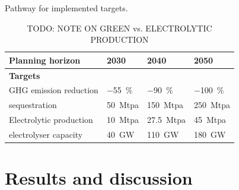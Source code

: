 \documentclass[preprint,12pt]{elsarticle}
\begin{document}
\begin{table}[htbp]
  \centering
  \caption{Pathway for implemented targets.}
  \label{tab:targets}
  \scriptsize
  \begin{tabularx}{\textwidth}{R{3.9cm}>{\centering\arraybackslash}X>{\centering\arraybackslash}X>{\centering\arraybackslash}X}
    \toprule
    \textbf{Planning horizon} & \textbf{2030} & \textbf{2040} & \textbf{2050} \\
    \midrule
    \textbf{Targets} & & & \\
    GHG emission reduction &  \SI{-55}{\percent} & \SI{-90}{\percent} & \SI{-100}{\percent} \\
     sequestration & \SI{50}{Mtpa} & \SI{150}{Mtpa} & \SI{250}{Mtpa} \\
    Electrolytic  production & \SI{10}{Mtpa} & \SI{27.5}{Mtpa} & \SI{45}{Mtpa} \\
     electrolyser capacity & \SI{40}{GW} &  \SI{110}{GW} &  \SI{180}{GW} \\
    \bottomrule
  \end{tabularx}
  \caption*{\scriptsize TODO: NOTE ON GREEN vs. ELECTROLYTIC  PRODUCTION}
\end{table}


\newpage
\section{Results and discussion}
\label{sec:results_and_discussion}
\end{document}
